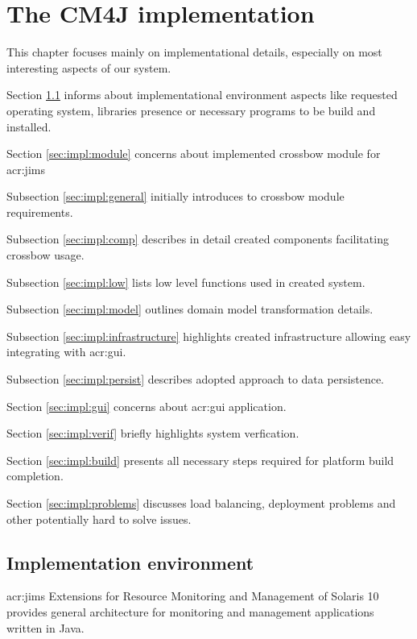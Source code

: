 \documentclass[11pt]{book}
\begin{document}
  \chapter{The CM4J implementation}
  \label{chap:impl}
	
      This chapter focuses mainly on implementational details, especially on most interesting aspects of our system.
		
      Section \ref{sec:impl:env} informs about implementational environment aspects like requested operating system,
      libraries presence or necessary programs to be build and installed. 
	  
	  Section \ref{sec:impl:module} concerns about implemented crossbow module for \gls{acr:jims}
	  
		\quad Subsection \ref{sec:impl:general} initially introduces to crossbow module requirements.

		\quad Subsection \ref{sec:impl:comp} describes in detail created components facilitating crossbow usage.
		
		\quad Subsection \ref{sec:impl:low} lists low level functions used in created system.

		\quad Subsection \ref{sec:impl:model} outlines domain model transformation details.
		
		\quad Subsection \ref{sec:impl:infrastructure} highlights created infrastructure allowing easy integrating with \gls{acr:gui}.
		
		\quad Subsection \ref{sec:impl:persist} describes adopted approach to data persistence.
		
	  
	  Section \ref{sec:impl:gui} concerns about \gls{acr:gui} application.
	  
	  Section \ref{sec:impl:verif} briefly highlights system verfication.
	
	  Section \ref{sec:impl:build} presents all necessary steps required for platform build completion.
	  
          Section \ref{sec:impl:problems} discusses load balancing, deployment problems and other potentially hard to solve issues.
		


    \section{Implementation environment}
    \label{sec:impl:env}

      \gls{acr:jims} Extensions for Resource Monitoring and Management of Solaris 10 provides general architecture for
      monitoring and management applications written in Java. 
\end{document}
